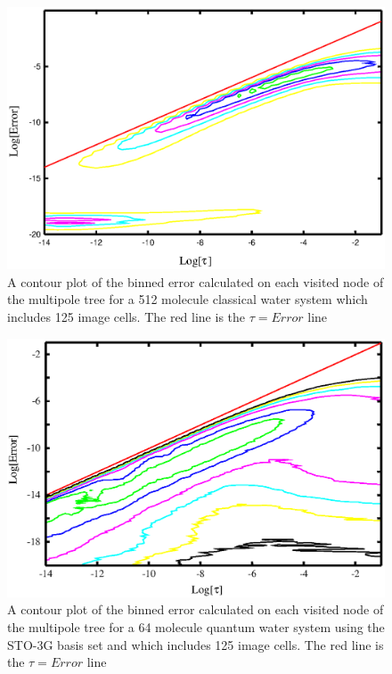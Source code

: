 \documentclass[prb,aps,nobibnotes,superbib,preprint]{revtex4}
\begin{document}
\begin{figure}
\caption{A contour plot of the binned error calculated on each visited node of the multipole tree for a 
512 molecule classical water system which includes 125 image cells.
The red line is the $\tau=Error$ line}
{\centering \includegraphics {Error_vs_TauMAC_bin_Water512.ps} \par} 
\label{figure:MultipoleErrorWaterC512} 
\end{figure}

\begin{figure}
\caption{A contour plot of the binned error calculated on each visited node of the multipole tree for a 
64 molecule quantum water system using the STO-3G basis set and which includes 125 image cells.
The red line is the $\tau=Error$ line}
{\centering \includegraphics{Error_vs_TauMAC_Water64_bin.ps} \par} 
\label{figure:MultipoleErrorWaterQ64} 
\end{figure}
\end{document}
